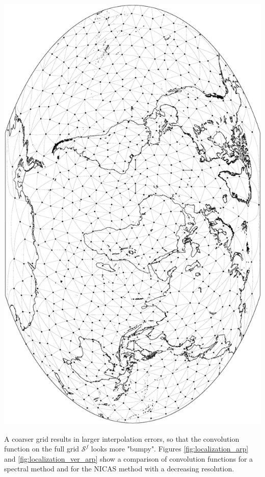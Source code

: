 \documentclass[12pt]{scrartcl}
\begin{document}
\begin{center}
\includegraphics[height=0.75\linewidth,angle=90]{arp_6B60_mesh_001_resol-4.pdf}
\end{center}

A coarser grid results in larger interpolation errors, so that the convolution function on the full grid $\mathcal{S}^f$ looks more "bumpy". Figures \ref{fig:localization_arp} and \ref{fig:localization_ver_arp} show a comparison of convolution functions for a spectral method and for the NICAS method with a decreasing resolution.
\end{document}
